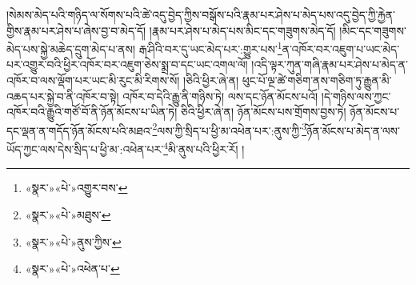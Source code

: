 །སེམས་མེད་པའི་གཉིད་ལ་སོགས་པའི་ཚེ་འདུ་བྱེད་ཀྱིས་བསྒོས་པའི་རྣམ་པར་ཤེས་པ་མེད་པས་འདུ་བྱེད་ཀྱི་རྐྱེན་གྱིས་རྣམ་པར་ཤེས་པ་ཞེས་བྱ་བ་མེད་དོ། །རྣམ་པར་ཤེས་པ་མེད་པས་མིང་དང་གཟུགས་མེད་དོ། །མིང་དང་གཟུགས་མེད་པས་སྐྱེ་མཆེད་དྲུག་མེད་པ་ནས། རྒ་ཤིའི་བར་དུ་ཡང་མེད་པར་:གྱུར་པས་\footnote{«སྣར་»«པེ་»འགྱུར་བས་}ན་འཁོར་བར་འཇུག་པ་ཡང་མེད་པར་འགྱུར་བའི་ཕྱིར་འཁོར་བར་འཇུག་ཅེས་སྨྲ་བ་དང་ཡང་འགལ་ལོ། །འདི་ལྟར་ཀུན་གཞི་རྣམ་པར་ཤེས་པ་མེད་ན་འཁོར་བ་ལས་ལྡོག་པར་ཡང་མི་རུང་མི་རིགས་སོ། །ཅིའི་ཕྱིར་ཞེ་ན། ཕུང་པོ་ལྔ་ཚེ་གཅིག་ནས་གཅིག་ཏུ་རྒྱུན་མི་འཆད་པར་སྐྱེ་བ་ནི་འཁོར་བ་སྟེ། འཁོར་བ་དེའི་རྒྱུ་ནི་གཉིས་ཏེ། ལས་དང་ཉོན་མོངས་པའོ། །དེ་གཉིས་ལས་ཀྱང་འཁོར་བའི་རྒྱུའི་གཙོ་བོ་ནི་ཉོན་མོངས་པ་ཡིན་ཏེ། ཅིའི་ཕྱིར་ཞེ་ན། ཉོན་མོངས་པས་གྲོགས་བྱས་ཏེ། ཉོན་མོངས་པ་དང་ལྡན་ན་གདོད་ཉོན་མོངས་པའི་མཐའ་\footnote{«སྣར་»«པེ་»མཐུས་}ལས་ཀྱི་སྲིད་པ་ཕྱི་མ་འཕེན་པར་:ནུས་ཀྱི་\footnote{«སྣར་»«པེ་»ནུས་ཀྱིས་}ཉོན་མོངས་པ་མེད་ན་ལས་ཡོད་ཀྱང་ལས་དེས་སྲིད་པ་ཕྱི་མ་:འཕེན་པར་\footnote{«སྣར་»«པེ་»འཕེན་པ་}མི་ནུས་པའི་ཕྱིར་རོ། །
